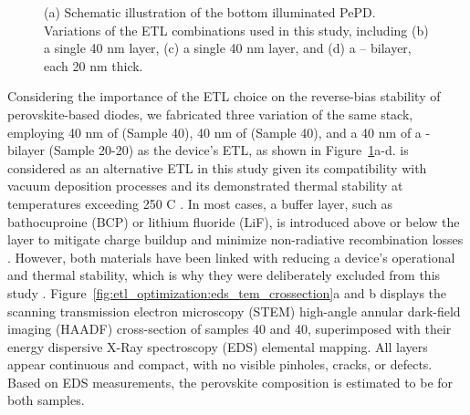 \begin{figure}[htbp]
    \caption{(a) Schematic illustration of the bottom illuminated PePD. Variations of the ETL combinations used in this study, including (b) a single 40 nm  layer, (c) a single 40 nm  layer, and (d) a  –  bilayer, each 20 nm thick.}
    \label{fig:etl_optimization:stacks}
\end{figure}

Considering the importance of the ETL choice on the reverse-bias stability of perovskite-based diodes, we fabricated three variation of the same stack, employing 40 nm of  (Sample 40), 40 nm of  (Sample 40), and a 40 nm of a - bilayer (Sample 20-20) as the device's ETL, as shown in Figure~\ref{fig:etl_optimization:stacks}a-d.  is considered as an alternative ETL in this study given its compatibility with vacuum deposition processes and its demonstrated thermal stability at temperatures exceeding 250 \degree C \cite{Sundar1992ThermalC60, Bracesco2024InPhotovoltaics}. In most cases, a buffer layer, such as bathocuproine (BCP) or lithium fluoride (LiF), is introduced above or below the  layer to mitigate charge buildup and minimize non-radiative recombination losses \cite{Chen2017EffectCells, Ye2022OvercomingCarborane}. However, both materials have been linked with reducing a device's operational and thermal stability, which is why they were deliberately excluded from this study \cite{Al-Ashouri2020MonolithicExtraction, Zheng2020EnhancedStrategy}. Figure~\ref{fig:etl_optimization:eds_tem_crossection}a and b displays the scanning transmission electron microscopy (STEM) high-angle annular dark-field imaging (HAADF) cross-section of samples 40 and 40, superimposed with their energy dispersive X-Ray spectroscopy (EDS) elemental mapping. All layers appear continuous and compact, with no visible pinholes, cracks, or defects. Based on EDS measurements, the perovskite composition is estimated to be  for both samples.



